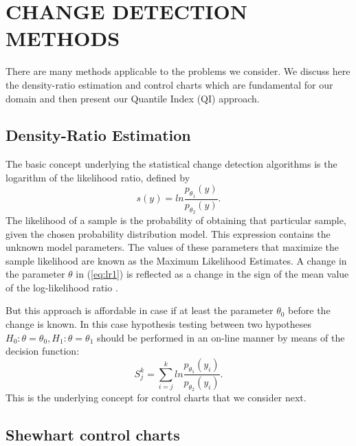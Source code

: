 \section{CHANGE DETECTION METHODS}
\label{sec:ourapproach}

There are many methods applicable to the problems we consider. We discuss here the density-ratio estimation and control charts which are fundamental for our domain and then present our Quantile Index (QI) approach.

\subsection{Density-Ratio Estimation}
The basic concept underlying the statistical change detection algorithms is the
logarithm of the likelihood ratio, defined by 
\begin{equation} \label{eq:lr1}
s(y) = ln \frac{p_{\theta_{1}}(y)}{p_{\theta_{2}}(y)}.
\end{equation}
The likelihood of a sample is the probability of obtaining that particular sample,
given the chosen probability distribution model. This expression contains the unknown model parameters.
The values of these parameters that maximize the sample likelihood are known as the
Maximum Likelihood Estimates. 
A change in the parameter $\theta$ in (\ref{eq:lr1}) is reflected as a change in the
sign of the mean value of the log-likelihood ratio \cite{I.V.Nikiforov}.

But this approach is affordable in case if at least the parameter $\theta_{0}$ before the change is known.
In this case hypothesis testing between two hypotheses $H_{0}: \theta = \theta_{0}, H_{1}: \theta = \theta_{1}$
should be performed in an on-line manner by means of the decision function:
\begin{equation}\label{eq:lr2}
S_{j}^{k} = \sum_{i=j}^{k}  ln \frac{p_{\theta_{1}}(y_{i})}{p_{\theta_{2}}(y_{i})}.
\end{equation}
This is the underlying concept for control charts that we consider next.

\subsection{Shewhart control charts}

